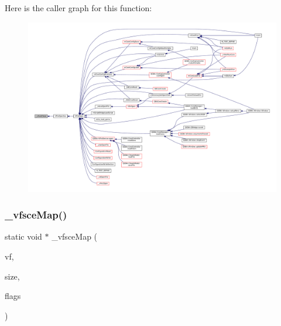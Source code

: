 Here is the caller graph for this function\+:
\nopagebreak
\begin{figure}[H]
\begin{center}
\leavevmode
\includegraphics[width=350pt]{sce-vfs_8c_abc890663d9c8ca3543876558a75cb392_icgraph}
\end{center}
\end{figure}
\mbox{\label{sce-vfs_8c_a7a2054da859a0182af242a8a0eb6d50d}} 
\subsubsection{\texorpdfstring{\+\_\+vfsce\+Map()}{\_vfsceMap()}}
{\footnotesize\ttfamily static void $\ast$ \+\_\+vfsce\+Map (\begin{DoxyParamCaption}\item[{struct V\+File $\ast$}]{vf,  }\item[{size\+\_\+t}]{size,  }\item[{\mbox{\hyperlink{ioapi_8h_a787fa3cf048117ba7123753c1e74fcd6}{int}}}]{flags }\end{DoxyParamCaption})\hspace{0.3cm}{\ttfamily [static]}}

